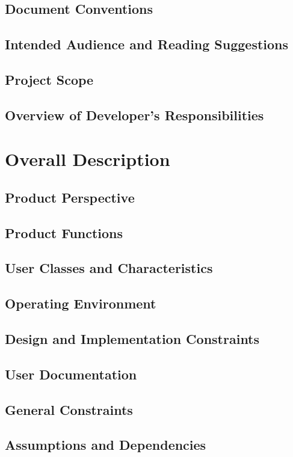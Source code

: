 \documentclass[11pt]{report}
\begin{document}
 \subsection{Document Conventions }    
 \subsection{Intended Audience and Reading Suggestions }    
 \subsection{Project Scope}    
 \subsection{Overview of Developer’s Responsibilities }    

\newpage
\section{Overall Description}
\subsection{Product Perspective}
\subsection{Product Functions}
\subsection{User Classes and Characteristics }
\subsection{Operating Environment}
\subsection{Design and Implementation Constraints}
\subsection{User Documentation}
\subsection{General Constraints}
\subsection{Assumptions and Dependencies}
\end{document}

